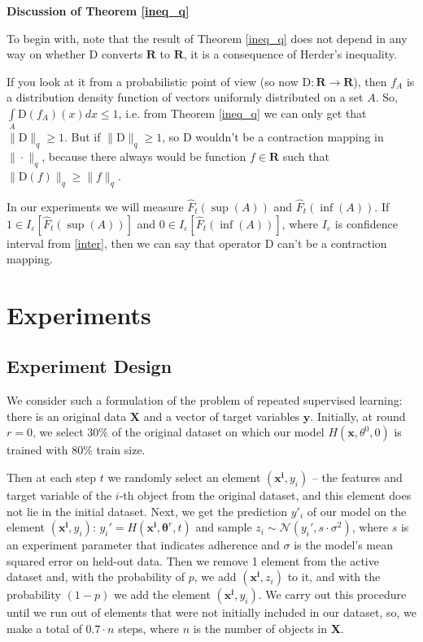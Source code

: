 \documentclass{article}
\begin{document}
    \textbf{Discussion of Theorem \ref{ineq_q}}

    To begin with, note that the result of Theorem \ref{ineq_q} does not depend in any way on whether $\text{D}$ converts $\mathbf{R}$ to $\mathbf{R}$, it is a consequence of Herder's inequality. 
    
    If you look at it from a probabilistic point of view (so now $\text{D} : \mathbf{R} \to \mathbf{R}$), then $f_A$ is a distribution density function of vectors uniformly distributed on a set $A$. So, $\int\limits_{A} \text{D}(f_A)(x)dx \leq 1$, i.e. from Theorem \ref{ineq_q} we can only get that $\|\text{D}\|_q \geq 1$. But if $\|\text{D}\|_q \geq 1$, so $\text{D}$ wouldn't be a contraction mapping in $\|\cdot\|_q$, because there always would be function $f \in \mathbf{R}$ such that $\|\text{D}(f)\|_q \geq \|f\|_q$.

    In our experiments we will measure $\hat{F}_t(\sup(A))$ and $\hat{F}_t(\inf(A))$. If $1 \in I_{\varepsilon}[\hat{F}_t(\sup(A))]$ and $0 \in I_{\varepsilon}[\hat{F}_t(\inf(A))]$, where $I_{\varepsilon}$ is confidence interval from \eqref{inter}, then we can say that operator $\text{D}$ can't be a contraction mapping.

\section{Experiments} \label{Experiments}

    \subsection{Experiment Design} \label{design}
        We consider such a formulation of the problem of repeated supervised learning: there is an original data $\textbf{X}$ and a vector of target variables $\mathbf{y}$. Initially, at round $r = 0$, we select $30\%$ of the original dataset on which our model $H(\mathbf{x}, \theta^0, 0)$ is trained with $80\%$ train size. 
        
        Then at each step $t$ we randomly select an element $(\mathbf{x^i}, y_i)$ -- the features and target variable of the $i$-th object from the original dataset, and this element does not lie in the initial dataset. Next, we get the prediction $y'_i$ of our model on the element $(\mathbf{x^i}, y_i)$: $y_i'=H(\mathbf{x^i}, \mathbf{\theta}^r, t)$ and sample $z_i \sim \mathcal{N}(y_i', s \cdot \sigma^2)$, where $s$ is an experiment parameter that indicates adherence and $\sigma$ is the model's mean squared error on held-out data. Then we remove 1 element from the active dataset and, with the probability of $p$, we add $(\mathbf{x^i}, z_i)$ to it, and with the probability $(1-p)$ we add the element $(\mathbf{x^i}, y_i)$. We carry out this procedure until we run out of elements that were not initially included in our dataset, so, we make a total of $0.7 \cdot n$ steps, where $n$ is the number of objects in $\textbf{X}$.
\end{document}
